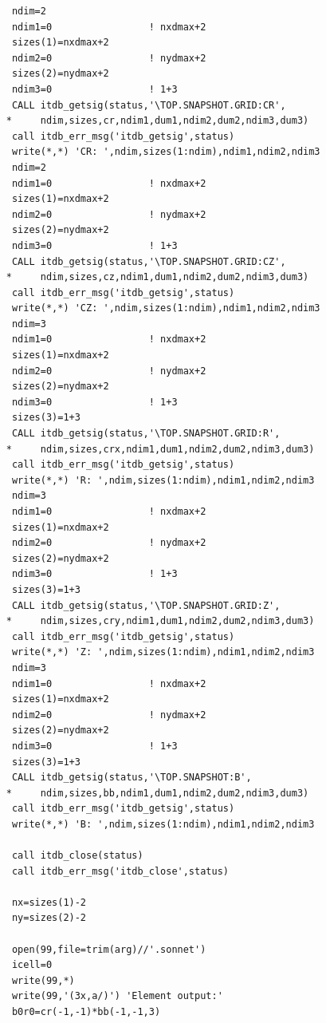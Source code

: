 \documentclass[a4paper,10pt]{report}
\begin{document}
\begin{verbatim}
      ndim=2
      ndim1=0                 ! nxdmax+2
      sizes(1)=nxdmax+2
      ndim2=0                 ! nydmax+2
      sizes(2)=nydmax+2
      ndim3=0                 ! 1+3
      CALL itdb_getsig(status,'\TOP.SNAPSHOT.GRID:CR',
     *     ndim,sizes,cr,ndim1,dum1,ndim2,dum2,ndim3,dum3)
      call itdb_err_msg('itdb_getsig',status)
      write(*,*) 'CR: ',ndim,sizes(1:ndim),ndim1,ndim2,ndim3
      ndim=2
      ndim1=0                 ! nxdmax+2
      sizes(1)=nxdmax+2
      ndim2=0                 ! nydmax+2
      sizes(2)=nydmax+2
      ndim3=0                 ! 1+3
      CALL itdb_getsig(status,'\TOP.SNAPSHOT.GRID:CZ',
     *     ndim,sizes,cz,ndim1,dum1,ndim2,dum2,ndim3,dum3)
      call itdb_err_msg('itdb_getsig',status)
      write(*,*) 'CZ: ',ndim,sizes(1:ndim),ndim1,ndim2,ndim3
      ndim=3
      ndim1=0                 ! nxdmax+2
      sizes(1)=nxdmax+2
      ndim2=0                 ! nydmax+2
      sizes(2)=nydmax+2
      ndim3=0                 ! 1+3
      sizes(3)=1+3
      CALL itdb_getsig(status,'\TOP.SNAPSHOT.GRID:R',
     *     ndim,sizes,crx,ndim1,dum1,ndim2,dum2,ndim3,dum3)
      call itdb_err_msg('itdb_getsig',status)
      write(*,*) 'R: ',ndim,sizes(1:ndim),ndim1,ndim2,ndim3
      ndim=3
      ndim1=0                 ! nxdmax+2
      sizes(1)=nxdmax+2
      ndim2=0                 ! nydmax+2
      sizes(2)=nydmax+2
      ndim3=0                 ! 1+3
      sizes(3)=1+3
      CALL itdb_getsig(status,'\TOP.SNAPSHOT.GRID:Z',
     *     ndim,sizes,cry,ndim1,dum1,ndim2,dum2,ndim3,dum3)
      call itdb_err_msg('itdb_getsig',status)
      write(*,*) 'Z: ',ndim,sizes(1:ndim),ndim1,ndim2,ndim3
      ndim=3
      ndim1=0                 ! nxdmax+2
      sizes(1)=nxdmax+2
      ndim2=0                 ! nydmax+2
      sizes(2)=nydmax+2
      ndim3=0                 ! 1+3
      sizes(3)=1+3
      CALL itdb_getsig(status,'\TOP.SNAPSHOT:B',
     *     ndim,sizes,bb,ndim1,dum1,ndim2,dum2,ndim3,dum3)
      call itdb_err_msg('itdb_getsig',status)
      write(*,*) 'B: ',ndim,sizes(1:ndim),ndim1,ndim2,ndim3

      call itdb_close(status)
      call itdb_err_msg('itdb_close',status)

      nx=sizes(1)-2
      ny=sizes(2)-2

      open(99,file=trim(arg)//'.sonnet')
      icell=0
      write(99,*)
      write(99,'(3x,a/)') 'Element output:'
      b0r0=cr(-1,-1)*bb(-1,-1,3)


\end{verbatim}
\end{document}
